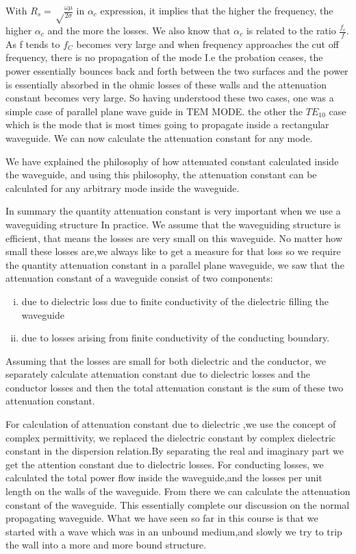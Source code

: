 With $R_s=\sqrt\frac{\omega\mu}{2\sigma}$ in $\alpha_{c}$ expression, it implies  that the higher the frequency, the higher $\alpha_{c}$ and the more the losses. We also know that $\alpha_{c}$  is related to the ratio $\frac{f_c}{f}$. As f tends to $f_C$ becomes very large and when frequency approaches the cut off frequency, there is no propagation of the mode I.e the probation ceases, the power essentially  bounces back and forth between  the two surfaces  and the power is essentially absorbed  in the ohmic losses  of these walls and the attenuation  constant  becomes very large. 
So having  understood these two cases, one was a simple case of parallel plane wave guide in TEM MODE. the other the $TE_{10}$ case which is the mode that is most times  going to propagate inside a rectangular waveguide. We can now calculate the attenuation  constant for any mode.   

We have explained   the philosophy of how attenuated constant calculated inside the waveguide, and using this philosophy, the attenuation  constant can be calculated for any arbitrary mode inside the waveguide.

In summary  the quantity  attenuation  constant is very important  when we use a waveguiding structure In practice. We assume that the waveguiding structure is efficient, that means the losses are very small on this waveguide.
No matter how small these losses are,we always like to get a measure  for that loss so we require the quantity attenuation constant in a parallel  plane waveguide, we saw that the attenuation constant of a waveguide consist of two components:
\begin{enumerate}[(i)]
\item due to dielectric  loss due to finite conductivity of the dielectric  filling the waveguide
\item due to losses arising from finite conductivity of the conducting boundary.
\end{enumerate}
Assuming  that the losses are small for both dielectric  and the conductor, we separately calculate attenuation  constant due to dielectric losses and the conductor  losses and then the total attenuation  constant is the sum of these two attenuation constant.

For calculation of attenuation  constant due to dielectric ,we use the concept of complex permittivity, we replaced the dielectric  constant by complex dielectric  constant in the dispersion relation.By separating the real and imaginary part we get the attention  constant due to dielectric losses. 
For conducting losses, we calculated the total power flow inside the waveguide,and the losses per unit length on the walls of the waveguide. From there we can calculate the attenuation  constant  of  the  waveguide. This essentially complete our discussion on the normal propagating waveguide. 
What we have seen so far in this course is that we started with a wave which was in an unbound medium,and slowly we try to trip the wall into a more and more bound structure.


